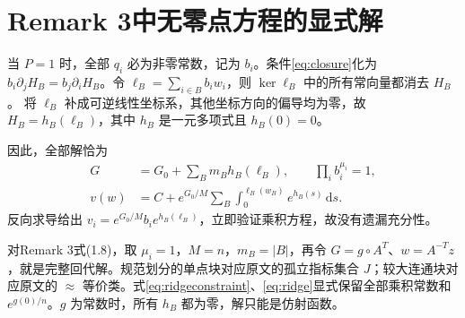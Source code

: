 \documentclass[UTF8,a4paper,zihao=-4,fontset=none]{ctexart}
\numberwithin{equation}{section}
\theoremstyle{definition}
\theoremstyle{definition}\newtheorem{definition}[theorem]{定义}
\newcommand{\dd}{\,\mathrm d}
\begin{document}
\section{Remark 3中无零点方程的显式解}
当 $P=1$ 时，全部 $q_i$ 必为非零常数，记为 $b_i$。条件\eqref{eq:closure}化为
$b_i\partial_jH_B=b_j\partial_iH_B$。令 $\ell_B=\sum_{i\in B}b_iw_i$，则 $\ker\ell_B$ 中的所有常向量都消去 $H_B$。
将 $\ell_B$ 补成可逆线性坐标系，其他坐标方向的偏导均为零，故 $H_B=h_B(\ell_B)$，其中 $h_B$ 是一元多项式且 $h_B(0)=0$。

因此，全部解恰为
\begin{align}
 G&=G_0+\sum_Bm_Bh_B(\ell_B),\qquad
 \prod_i b_i^{\mu_i}=1,\label{eq:ridgeconstraint}\\
 v(w)&=C+e^{G_0/M}\sum_B\int_0^{\ell_B(w_B)}e^{h_B(s)}\dd s.
 \label{eq:ridge}
\end{align}
反向求导给出 $v_i=e^{G_0/M}b_ie^{h_B(\ell_B)}$，立即验证乘积方程，故没有遗漏充分性。

对Remark 3式(1.8)，取 $\mu_i=1$，$M=n$，$m_B=|B|$，再令 $G=g\circ A^T$、$w=A^{-T}z$，就是完整回代解。规范划分的单点块对应原文的孤立指标集合 $J$；较大连通块对应原文的 $\approx$ 等价类。式\eqref{eq:ridgeconstraint}、\eqref{eq:ridge}显式保留全部乘积常数和 $e^{g(0)/n}$。$g$ 为常数时，所有 $h_B$ 都为零，解只能是仿射函数。
\end{document}
